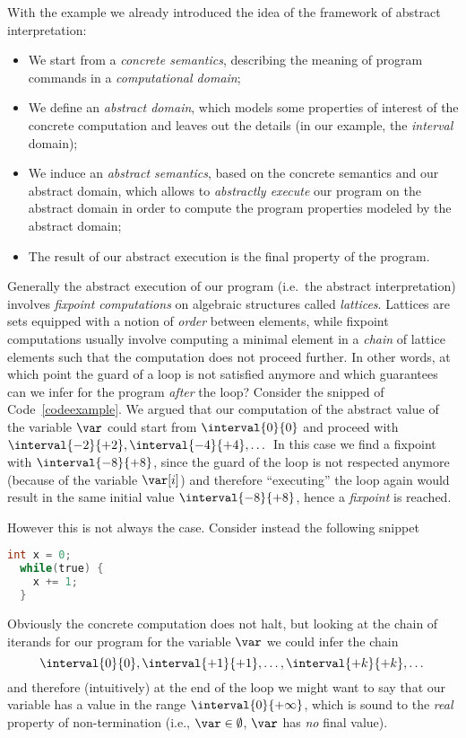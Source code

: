 \medskip

\noindent
With the example we already introduced the idea of the framework of
abstract interpretation:
\begin{itemize}
\item We start from a \emph{concrete semantics}, describing the
  meaning of program commands in a \emph{computational domain};
\item We define an \emph{abstract domain}, which models some
  properties of interest of the concrete computation and leaves out
  the details (in our example, the \emph{interval} domain);
\item We induce an \emph{abstract semantics}, based on the concrete
  semantics and our abstract domain, which allows to \emph{abstractly
    execute} our program on the abstract domain in order to compute
  the program properties modeled by the abstract domain;
\item The result of our abstract execution is the final property of
  the program.
\end{itemize}
Generally the abstract execution of our program (i.e.\ the abstract
interpretation) involves \emph{fixpoint computations} on algebraic
structures called \emph{lattices}. Lattices are sets equipped with a
notion of \emph{order} between elements, while fixpoint computations
usually involve computing a minimal element in a \emph{chain} of
lattice elements such that the computation does not proceed further.
In other words, at which point the guard of a loop is not satisfied
anymore and which guarantees can we infer for the program \emph{after}
the loop? Consider the snipped of Code~\ref{codeexample}. We argued
that our computation of the abstract value of the variable \(\var\)
could start from \(\interval{0}{0}\) and proceed with
\(\interval{-2}{+2}, \interval{-4}{+4}, \dots\) In this case we find a
fixpoint with \(\interval{-8}{+8}\), since the guard of the loop is
not respected anymore (because of the variable \(\var[i]\)) and
therefore ``executing'' the loop again would result in the same
initial value \(\interval{-8}{+8}\), hence a \emph{fixpoint} is
reached.

\medskip

\noindent
However this is not always the case. Consider instead the following
snippet
\begin{lstlisting}[language=C, label=exampleloop]
  int x = 0;
  while(true) {
    x += 1;
  }
\end{lstlisting}
Obviously the concrete computation does not halt, but looking at the
chain of iterands for our program for the variable \(\var\) we could
infer the chain
\begin{equation*}
  \interval{0}{0}, \interval{+1}{+1}, \dots, \interval{+k}{+k}, \dots
\end{equation*}
and therefore (intuitively) at the end of the loop we might want to
say that our variable has a value in the range
\(\interval{0}{+\infty}\), which is sound to the \emph{real} property
of non-termination (i.e., \(\var\in\emptyset\), \(\var\) has
\emph{no} final value).

